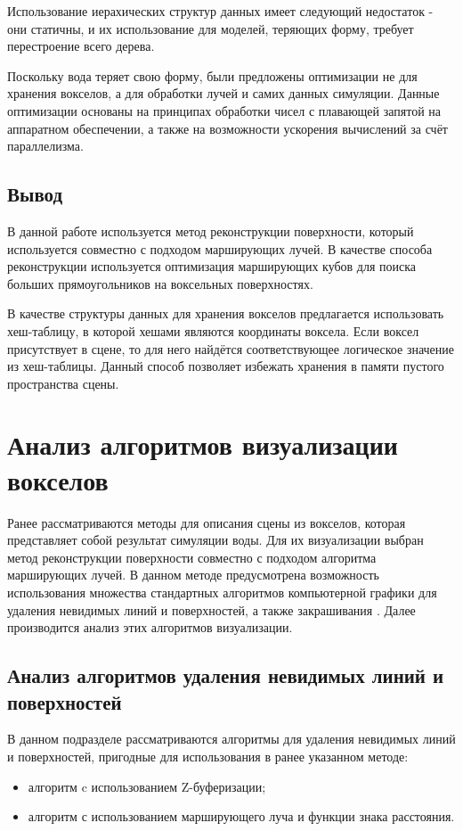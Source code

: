 Использование иерахических структур данных имеет следующий недостаток - они статичны, и их
использование для моделей, теряющих форму, требует перестроение всего дерева\cite{article:asvo}.

Поскольку вода теряет свою форму, были предложены оптимизации не для хранения вокселов, а для
обработки лучей и самих данных симуляции. Данные оптимизации основаны на принципах обработки
чисел с плавающей запятой на аппаратном обеспечении, а также на возможности ускорения
вычислений за счёт параллелизма\cite{book:ash}.

\subsection{Вывод}

В данной работе используется метод реконструкции поверхности, который используется
совместно с подходом марширующих лучей. В качестве способа реконструкции используется оптимизация
марширующих кубов для поиска больших прямоугольников на воксельных поверхностях.

В качестве структуры данных для хранения вокселов предлагается использовать хеш-таблицу, в которой хешами являются
координаты воксела. Если воксел присутствует в сцене, то для него найдётся соответствующее логическое значение из
 хеш-таблицы. Данный способ позволяет избежать хранения в памяти пустого пространства сцены.


\section{Анализ алгоритмов визуализации вокселов}

Ранее рассматриваются методы для описания сцены из вокселов, которая представляет собой
результат симуляции воды. Для их визуализации выбран метод реконструкции поверхности
совместно с подходом алгоритма марширующих лучей. В данном методе предусмотрена возможность использования множества стандартных
алгоритмов компьютерной графики для удаления невидимых линий и поверхностей, а также закрашивания \cite{book:ash}. Далее производится анализ этих алгоритмов визуализации.

\subsection{Анализ алгоритмов удаления невидимых линий и поверхностей}

В данном подразделе рассматриваются алгоритмы для удаления невидимых линий и поверхностей, пригодные
для использования в ранее указанном методе:
\begin{itemize}
    \item алгоритм c использованием Z-буферизации;
    \item алгоритм с использованием марширующего луча и функции знака расстояния.
\end{itemize}

